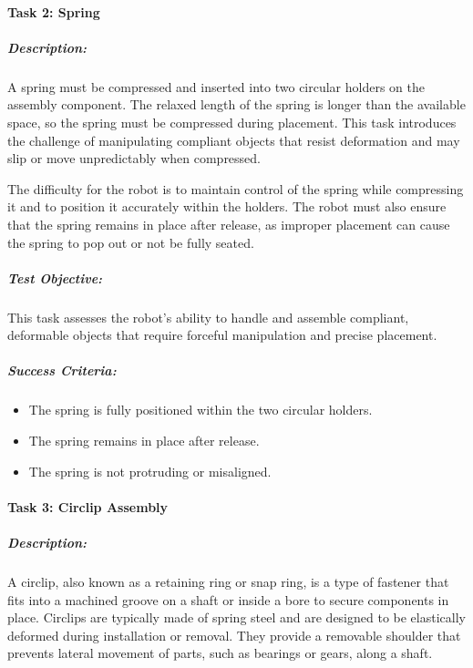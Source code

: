 \documentclass[letterpaper,10pt,english]{sphinxmanual}
\begin{document}
\paragraph{Task 2: Spring}
\label{\detokenize{robotic_instructions_elastic_deformation:task-2-spring}}

\subparagraph{Description:}
\label{\detokenize{robotic_instructions_elastic_deformation:id1}}
\sphinxAtStartPar
A spring must be compressed and inserted into two circular holders on the assembly component. The relaxed length of the spring is longer than the available space, so the spring must be compressed during placement. This task introduces the challenge of manipulating compliant objects that resist deformation and may slip or move unpredictably when compressed.

\sphinxAtStartPar
The difficulty for the robot is to maintain control of the spring while compressing it and to position it accurately within the holders.
The robot must also ensure that the spring remains in place after release, as improper placement can cause the spring to pop out or not be fully seated.


\subparagraph{Test Objective:}
\label{\detokenize{robotic_instructions_elastic_deformation:id2}}
\sphinxAtStartPar
This task assesses the robot’s ability to handle and assemble compliant, deformable objects that require forceful manipulation and precise placement.


\subparagraph{Success Criteria:}
\label{\detokenize{robotic_instructions_elastic_deformation:id3}}\begin{itemize}
\item {} 
\sphinxAtStartPar
The spring is fully positioned within the two circular holders.

\item {} 
\sphinxAtStartPar
The spring remains in place after release.

\item {} 
\sphinxAtStartPar
The spring is not protruding or misaligned.

\end{itemize}


\paragraph{Task 3: Circlip Assembly}
\label{\detokenize{robotic_instructions_elastic_deformation:task-3-circlip-assembly}}

\subparagraph{Description:}
\label{\detokenize{robotic_instructions_elastic_deformation:id4}}
\sphinxAtStartPar
A circlip, also known as a retaining ring or snap ring, is a type of fastener that fits into a machined groove on a shaft or inside a bore to secure components in place.
Circlips are typically made of spring steel and are designed to be elastically deformed during installation or removal.
They provide a removable shoulder that prevents lateral movement of parts, such as bearings or gears, along a shaft.
\end{document}
